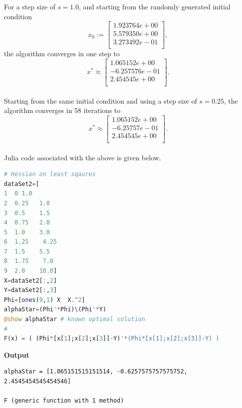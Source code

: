 For a step size of $s=1.0$, and starting from the randomly generated initial condition
\begin{equation}
x_0:=\left[
\begin{array}{r}
1.923764e+00 \\
5.579350e+00 \\
3.273492e-01 \\
\end{array}
\right],
\end{equation}
the algorithm converges in one step to
\begin{equation}
x^\ast \approx \left[
\begin{array}{r}
1.065152e+00 \\
-6.257576e-01 \\
2.454545e+00 \\
\end{array}
\right].
\end{equation}\\

Starting from the same initial condition and using a step size of $s=0.25$, the algorithm converges in 58 iterations to 
\begin{equation}
x^\ast \approx \left[
\begin{array}{c}
1.065152e+00 \\
-6.25757e-01 \\
2.454545e+00 \\
\end{array}
\right].
\end{equation}\\

Julia code associated with the above is given below.
\Qed

\begin{lstlisting}[language=Julia, style=mystyle]
# Hessian on least sqaures
dataSet2=[
1  0 1.0 
2  0.25   1.0
3  0.5    1.5
4  0.75   2.0
5  1.0    3.0
6  1.25    4.25
7  1.5    5.5
8  1.75    7.0 
9  2.0    10.0]
X=dataSet2[:,2]
Y=dataSet2[:,3]
Phi=[ones(9,1) X  X.^2]
alphaStar=(Phi'*Phi)\(Phi'*Y)
@show alphaStar # known optimal solution 
#
F(x) = ( (Phi*[x[1];x[2];x[3]]-Y)'*(Phi*[x[1];x[2];x[3]]-Y) )
\end{lstlisting}
\textbf{Output} 
\begin{verbatim}
alphaStar = [1.065151515151514, -0.6257575757575752, 2.4545454545454546]

F (generic function with 1 method)
\end{verbatim}

